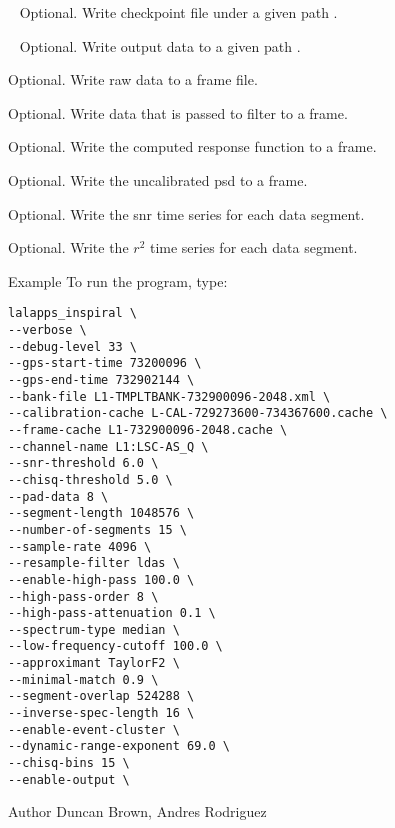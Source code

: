 \begin{entry}
\begin{entry}
\item[\option{--checkpoint-path}~\parm{PATH}] Optional. Write checkpoint 
file under a given path .

\item[\option{--output-path}~\parm{PATH}] Optional. Write output data to 
a given path .

\item[\option{--write-raw-data}] Optional. Write raw data to a frame file.

\item[\option{--write-filter-data}] Optional. Write data that is passed to 
filter to a frame.

\item[\option{--write-response}] Optional. Write the computed response 
function to a frame.

\item[\option{--write-spectrum}] Optional. Write the uncalibrated psd to a 
frame.

\item[\option{--write-snrsq}] Optional. Write the snr time series for each 
data segment.

\item[\option{--write-chisq}] Optional. Write the $r^2$ time series for each 
data segment.


\end{entry}

\item[Example]
To run the program, type:
\begin{verbatim}
lalapps_inspiral \
--verbose \
--debug-level 33 \ 
--gps-start-time 73200096 \
--gps-end-time 732902144 \
--bank-file L1-TMPLTBANK-732900096-2048.xml \
--calibration-cache L-CAL-729273600-734367600.cache \ 
--frame-cache L1-732900096-2048.cache \
--channel-name L1:LSC-AS_Q \
--snr-threshold 6.0 \
--chisq-threshold 5.0 \
--pad-data 8 \
--segment-length 1048576 \
--number-of-segments 15 \
--sample-rate 4096 \
--resample-filter ldas \
--enable-high-pass 100.0 \ 
--high-pass-order 8 \
--high-pass-attenuation 0.1 \ 
--spectrum-type median \
--low-frequency-cutoff 100.0 \ 
--approximant TaylorF2 \
--minimal-match 0.9 \
--segment-overlap 524288 \
--inverse-spec-length 16 \
--enable-event-cluster \
--dynamic-range-exponent 69.0 \ 
--chisq-bins 15 \
--enable-output \
\end{verbatim} 





\item[Author] Duncan Brown, Andres Rodriguez 
\end{entry}
